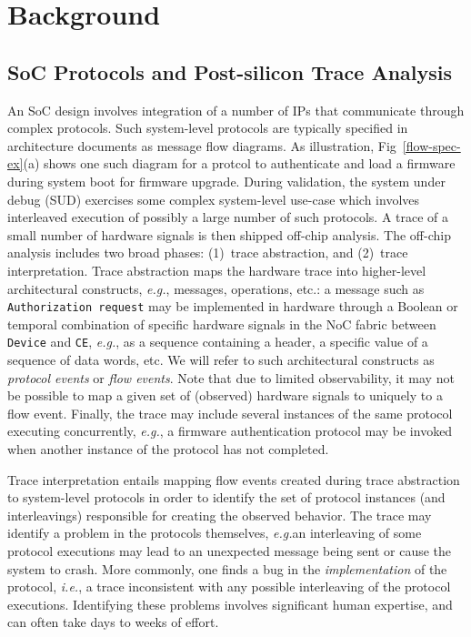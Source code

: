 \documentclass[conference]{IEEEtran}
\newcommand{\eg}{\mbox{{\em e.g.}}}
\newcommand{\ie}{\mbox{{\em i.e.}}}
\begin{document}
\section{Background}

\subsection{SoC Protocols and Post-silicon Trace Analysis}

An SoC design involves integration of a number of IPs that
communicate through complex protocols.  Such system-level
protocols are typically specified in architecture documents
as message flow diagrams.  As illustration,
Fig~\ref{flow-spec-ex}(a) shows one such diagram for a
protcol to authenticate and load a firmware during system
boot for firmware upgrade.  During validation, the system
under debug (SUD) exercises some complex system-level
use-case which involves interleaved execution of possibly a
large number of such protocols.  A trace of a small number
of hardware signals is then shipped off-chip analysis.  The
off-chip analysis includes two broad phases: (1)~trace
abstraction, and (2)~trace interpretation.  Trace
abstraction maps the hardware trace into higher-level
architectural constructs, \eg, messages, operations, etc.: a
message such as {\tt Authorization request} may be
implemented in hardware through a Boolean or temporal
combination of specific hardware signals in the NoC fabric
between {\tt Device} and {\tt CE}, \eg, as a sequence
containing a header, a specific value of a sequence of data
words, etc.  We will refer to such architectural constructs
as {\em protocol events} or {\em flow events}.  Note that
due to limited observability, it may not be possible to map
a given set of (observed) hardware signals to uniquely to a
flow event.  Finally, the trace may include several
instances of the same protocol executing concurrently, \eg,
a firmware authentication protocol may be invoked when
another instance of the protocol has not completed.  

Trace interpretation entails mapping flow events created
during trace abstraction to system-level protocols in order
to identify the set of protocol instances (and
interleavings) responsible for creating the observed
behavior.  The trace may identify a problem in the protocols
themselves, \eg an interleaving of some protocol executions
may lead to an unexpected message being sent or cause the
system to crash.  More commonly, one finds a bug in the {\em
  implementation} of the protocol, \ie, a trace inconsistent
with any possible interleaving of the protocol executions.
Identifying these problems involves significant human
expertise, and can often take days to weeks of effort.
\end{document}
